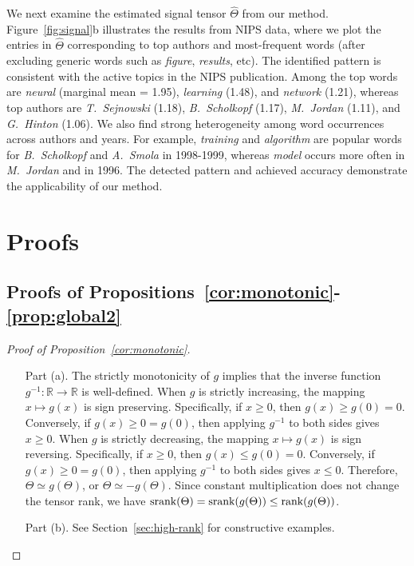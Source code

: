 \documentclass[twoside,11pt]{article}
\theoremstyle{plain}
\theoremstyle{definition}
\def\srank{\textup{srank}}
\def\rank{\textup{rank}}
\begin{document}
We next examine the estimated signal tensor $\hat \Theta$ from our method.  Figure~\ref{fig:signal}b illustrates the results from NIPS data, where we plot the entries in $\hat \Theta$ corresponding to top authors and most-frequent words (after excluding generic words such as \emph{figure}, \emph{results}, etc). The identified pattern is consistent with the active topics in the NIPS publication. Among the top words are \emph{neural} (marginal mean = 1.95), \emph{learning} (1.48), and \emph{network} (1.21), whereas top authors are \emph{T.\ Sejnowski} (1.18), \emph{B.~Scholkopf} (1.17), \emph{M.\ Jordan} (1.11), and \emph{G.\ Hinton} (1.06). We also find strong heterogeneity among word occurrences across authors and years. For example, \emph{training} and \emph{algorithm} are popular words for \emph{B.\ Scholkopf} and \emph{A.\ Smola} in 1998-1999, whereas \emph{model} occurs more often in \emph{M.\ Jordan} and in 1996. The detected pattern and achieved accuracy demonstrate the applicability of our method.





\section{Proofs}\label{sec:proofs}
\subsection{Proofs of Propositions~\ref{cor:monotonic}-\ref{prop:global2}}
\begin{proof}[Proof of Proposition~\ref{cor:monotonic}] \hfill
\begin{enumerate}[label={2.\arabic*},wide, labelindent=0pt]
\item[Part (a).] The strictly monotonicity of $g$ implies that the inverse function $g^{-1}\colon \mathbb{R}\to \mathbb{R}$ is well-defined. 
When $g$ is strictly increasing, the mapping $x\mapsto g(x)$ is sign preserving. Specifically, if $x\geq 0$, then $g(x)\geq g(0)=0$. Conversely, if $g(x)\geq 0=g(0)$, then applying $g^{-1}$ to both sides gives $x\geq 0$.
When $g$ is strictly decreasing, the mapping $x\mapsto g(x)$ is sign reversing. Specifically, if $x\geq 0$, then $g(x)\leq g(0)=0$. Conversely, if $g(x)\geq 0=g(0)$, then applying $g^{-1}$ to both sides gives $x\leq 0$.
 Therefore, $\Theta\simeq g(\Theta)$,  or $\Theta\simeq -g(\Theta)$. Since constant multiplication  does not change the tensor rank,  we have $\srank(\Theta)=\srank(g(\Theta))\leq \rank (g(\Theta))$. 
\item[Part (b).] See Section~\ref{sec:high-rank} for constructive examples.
\end{enumerate}
\end{proof}
\end{document}

